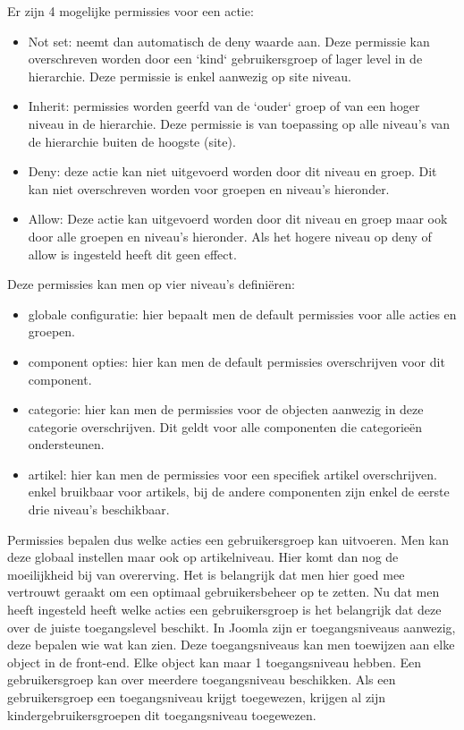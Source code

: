 Er zijn 4 mogelijke permissies voor een actie:
\begin{itemize}
    \item Not set: neemt dan automatisch de deny waarde aan. Deze permissie kan overschreven worden door een `kind` gebruikersgroep of lager level in de hierarchie. Deze permissie is enkel aanwezig op site niveau.
    \item Inherit: permissies worden geerfd van de `ouder` groep of van een hoger niveau in de hierarchie. Deze permissie is van toepassing op alle niveau's van de hierarchie buiten de hoogste (site).
    \item Deny: deze actie kan niet uitgevoerd worden door dit niveau en groep. Dit kan niet overschreven worden voor groepen en niveau's hieronder.
    \item Allow: Deze actie kan uitgevoerd worden door dit niveau en groep maar ook door alle groepen en niveau's hieronder. Als het hogere niveau op deny of allow is ingesteld heeft dit geen effect.
\end{itemize}

Deze permissies kan men op vier niveau's definiëren:
\begin{itemize}
\item globale configuratie: hier bepaalt men de default permissies voor alle acties en groepen.
\item component opties: hier kan men de default permissies overschrijven voor dit component.
\item categorie: hier kan men de permissies voor de objecten aanwezig in deze categorie overschrijven. Dit geldt voor alle componenten die categorieën ondersteunen.
\item artikel: hier kan men de permissies voor een specifiek artikel overschrijven. enkel bruikbaar voor artikels, bij de andere componenten zijn enkel de eerste drie niveau's beschikbaar.
\end{itemize}
Permissies bepalen dus welke acties een gebruikersgroep kan uitvoeren. Men kan deze globaal instellen maar ook op artikelniveau. Hier komt dan nog de moeilijkheid bij van overerving. Het is belangrijk dat men hier goed mee vertrouwt geraakt om een optimaal gebruikersbeheer op te zetten. Nu dat men heeft ingesteld heeft welke acties een gebruikersgroep is het belangrijk dat deze over de juiste toegangslevel beschikt. In Joomla zijn er toegangsniveaus aanwezig, deze bepalen wie wat kan zien. Deze toegangsniveaus kan men toewijzen aan elke object in de front-end. Elke object kan maar 1 toegangsniveau hebben. Een gebruikersgroep kan over meerdere toegangsniveau beschikken. Als een gebruikersgroep een toegangsniveau krijgt toegewezen, krijgen al zijn kindergebruikersgroepen dit toegangsniveau toegewezen.

